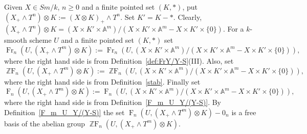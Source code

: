 \documentclass[a4paper,11pt,reqno]{amsart}
\begin{document}
Given $X\in Sm/k$, $n{\geqslant} 0$ and a finite pointed set $(K,*)$, put
$(X_+\wedge T^n)\otimes K:=(X\otimes K)_+\wedge T^n$.
Set $K'=K-*$. Clearly,
$(X_+\wedge T^n)\otimes K=(X\times K'\times {\mathbb{A}}^m)/(X\times K'\times {\mathbb{A}}^m-X\times K'\times \{0\})$.
For a $k$-smooth scheme $U$ and a finite pointed set $(K,*)$ set
\begin{equation}\label{eq:Fr_n_U_X_times_T_m_otimes_K}
{\operatorname{Fr}}_n(U,(X_+\wedge T^m)\otimes K):={\operatorname{Fr}}_n(U,(X\times K'\times {\mathbb{A}}^m)/(X\times K'\times {\mathbb{A}}^m-X\times K'\times \{0\})),
\end{equation}
where the right hand side is from Definition~\ref{def:FrY/Y-S}(III).
Also, set
\begin{equation*}\label{eq:ZF_n_U_X_times_T_m_otimes_K}
{\operatorname{\mathbb{Z}F}}_n(U,(X_+\wedge T^m)\otimes K):={\operatorname{\mathbb{Z}F}}_n(U,(X\times K'\times {\mathbb{A}}^m)/(X\times K'\times {\mathbb{A}}^m-X\times K'\times \{0\})),
\end{equation*}
where the right hand side is from Definition~\ref{stab}. Finally set
\begin{equation}\label{eq:F_n_U_X_times_T_m_otimes_K}
{\operatorname{F}}_n(U,(X_+\wedge T^m)\otimes K):={\operatorname{F}}_n(U,(X\times K'\times {\mathbb{A}}^m)/(X\times K'\times {\mathbb{A}}^m-X\times K'\times \{0\})),
\end{equation}
where the right hand side is from Definition~\ref{F_m_U_Y/(Y-S)}.
By Definition~\ref{F_m_U_Y/(Y-S)} the set ${\operatorname{F}}_n(U,(X_+\wedge T^m)\otimes K)-0_n$
is a free basis of the abelian group ${\operatorname{\mathbb{Z}F}}_n(U,(X_+\wedge T^m)\otimes K)$.
\end{document}
